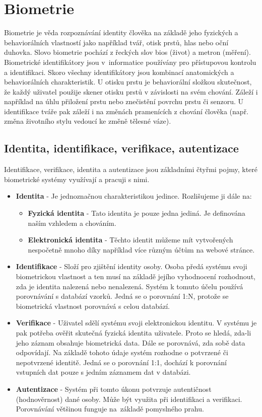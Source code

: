\chapter{Biometrie} 
Biometrie je věda rozpoznávání identity člověka na základě jeho fyzických a behaviorálních vlastností jako například tvář, otisk prstů, hlas nebo oční duhovka. \cite{Jain2008} Slovo biometrie pochází z řeckých slov bios (život) a metron (měření). Biometrické identifikátory jsou v~informatice používány pro přístupovou kontrolu a identifikaci. Skoro všechny identifikátory jsou kombinací anatomických a behaviorálních charakteristik. U otisku prstu je behaviorální složkou skutečnost, že každý uživatel použije skener otisku prstů v závislosti na svém chování. Záleží i například na úhlu přiložení prstu nebo znečistění povrchu prstu či senzoru. U identifikace tváře pak záleží i na změnách pramenících z chování člověka (např. změna životního stylu vedoucí ke změně tělesné váze).\cite{Maltoni2009}
\section{Identita, identifikace, verifikace, autentizace}
Identifikace, verifikace, identita a autentizace jsou základními čtyřmi pojmy, které biometrické systémy využívají a pracuji s nimi.\cite{Drahansky}
\begin{itemize}
    \item \textbf{Identita} - Je jednoznačnou charakteristikou jedince. Rozlišujeme ji dále na:
        \begin{itemize}
            \item \textbf{Fyzická identita} - Tato identita je pouze jedna jediná. Je definována naším vzhledem a chováním.
            \item \textbf{Elektronická identita} - Těchto identit můžeme mít vytvořených nespočetně mnoho díky například více různým účtům na webové stránce.
        \end{itemize}
    \item \textbf{Identifikace} - Složí pro zjištění identity osoby. Osoba předá systému svoji biometrickou vlastnost a ten musí na základě jejího vyhodnocení rozhodnout, zda je identita nalezená nebo nenalezená. Systém k tomuto účelu používá porovnávání s databází vzorků. Jedná se o porovnání 1:N, protože se biometrická vlastnost porovnává s celou databází.
    \item \textbf{Verifikace} - Uživatel sdělí systému svoji elektronickou identitu. V systému je pak potřeba ověřit skutečná fyzická identita uživatele. Proto se hledá, zda-li jeho záznam obsahuje biometrická data. Dále se porovnává, zda sobě data odpovídají. Na základě tohoto údaje systém rozhodne o potvrzené či nepotvrzené identitě. Jedná se o porovnání 1:1, dochází k porovnání vstupních dat pouze s jedním záznamem dat v databázi.
    \item \textbf{Autentizace} - Systém při tomto úkonu potvrzuje autentičnost (hodnověrnost) dané osoby. Může být využita při identifikaci a verifikaci. Porovnávání většinou funguje na~základě pomyslného prahu.
\end{itemize}

